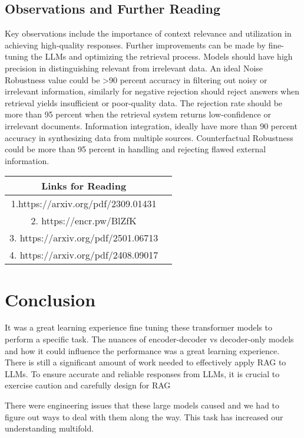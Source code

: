 \documentclass{article}
\begin{document}
\subsection{Observations and Further Reading}

Key observations include the importance of context relevance and utilization in achieving high-quality responses. Further improvements can be made by fine-tuning the LLMs and optimizing the retrieval process. Models should have high precision in distinguishing relevant from irrelevant data. An ideal Noise Robustness value could be >90 percent accuracy in filtering out noisy or irrelevant information, similarly for negative rejection should reject answers when retrieval yields insufficient or poor-quality data. The rejection rate should be  more than 95 percent when the retrieval system returns low-confidence or irrelevant documents. Information integration, ideally have more than 90 percent accuracy in synthesizing data from multiple sources. Counterfactual Robustness could be more than 95 percent in handling and rejecting flawed external information. 
\begin{center}
\begin{tabular}{|c|c|}
\hline
Links for Reading \\
\hline
1.https://arxiv.org/pdf/2309.01431\\
2. https://encr.pw/BlZfK\\
3. https://arxiv.org/pdf/2501.06713\\
4. https://arxiv.org/pdf/2408.09017\\
\hline
\end{tabular}
\end{center}
\section{Conclusion}

It was a great learning experience fine tuning these transformer models to perform a specific task. The nuances of encoder-decoder vs decoder-only models and how it could influence the performance was a great learning experience.  There is still a significant amount
of work needed to effectively apply RAG to LLMs. To ensure accurate and reliable responses from LLMs, it is crucial
to exercise caution and carefully design for RAG

There were engineering issues that these large models caused and we had to figure out ways to deal with them along the way. This task has increased our understanding multifold.
\end{document}
